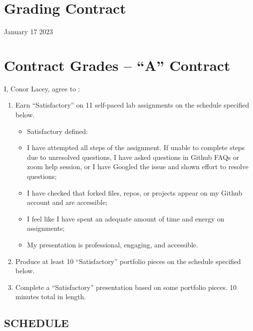 \documentclass[
]{article}
\author{}
\date{\vspace{-2.5em}}
\providecommand{\tightlist}{%
  \setlength{\itemsep}{0pt}\setlength{\parskip}{0pt}}
\begin{document}
\hypertarget{grading-contract}{%
\section{Grading Contract}\label{grading-contract}}

January 17 2023

\hypertarget{contract-grades-a-contract}{%
\section{Contract Grades -- ``A''
Contract}\label{contract-grades-a-contract}}

I, Conor Lacey, agree to :

\begin{enumerate}
\def\labelenumi{\arabic{enumi})}
\tightlist
\item
  Earn ``Satisfactory'' on 11 self-paced lab assignments on the schedule
  specified below.

  \begin{itemize}
  \tightlist
  \item
    Satisfactory defined:
  \item
    I have attempted all steps of the assignment. If unable to complete
    steps due to unresolved questions, I have asked questions in Github
    FAQs or zoom help session, or I have Googled the issue and shown
    effort to resolve questions;
  \item
    I have checked that forked files, repos, or projects appear on my
    Github account and are accessible;
  \item
    I feel like I have spent an adequate amount of time and energy on
    assignments;
  \item
    My presentation is professional, engaging, and accessible.
  \end{itemize}
\item
  Produce at least 10 ``Satisfactory'' portfolio pieces on the schedule
  specified below.
\item
  Complete a ``Satisfactory'' presentation based on some portfolio
  pieces. 10 minutes total in length.
\end{enumerate}

\hypertarget{schedule}{%
\subsection{SCHEDULE}\label{schedule}}
\end{document}
